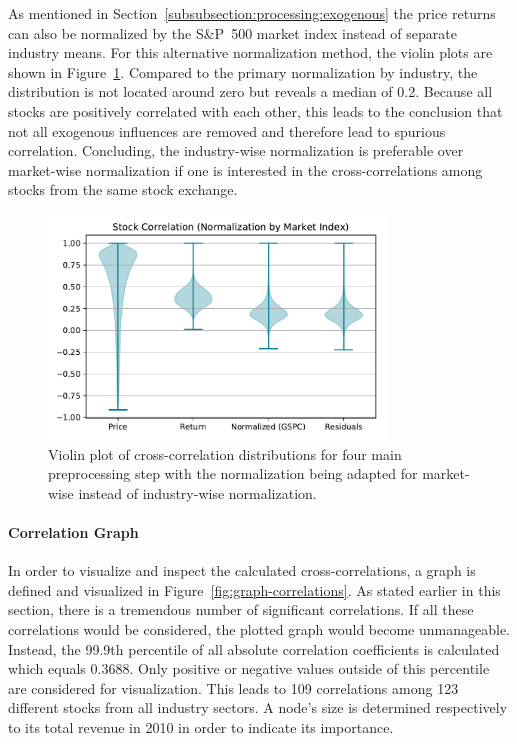 As mentioned in Section~\ref{subsubsection:processing:exogenous} the price returns can also be normalized by the S\&P~500 market index instead of separate industry means. For this alternative normalization method, the violin plots are shown in Figure~\ref{fig:steps-correlations-gspc}. Compared to the primary normalization by industry, the distribution is not located around zero but reveals a median of 0.2. Because all stocks are positively correlated with each other, this leads to the conclusion that not all exogenous influences are removed and therefore lead to spurious correlation. Concluding, the industry-wise normalization is preferable over market-wise normalization if one is interested in the cross-correlations among stocks from the same stock exchange.

\begin{figure}[!ht]
    \centering
    \includegraphics[width=0.8\textwidth]{figures/regression/steps-correlations-gspc-norm.pdf}
    \caption{Violin plot of cross-correlation distributions for four main preprocessing step with the normalization being adapted for market-wise instead of industry-wise normalization.}
    \label{fig:steps-correlations-gspc}
\end{figure}


\paragraph{Correlation Graph}

In order to visualize and inspect the calculated cross-correlations, a graph is defined and visualized in Figure~\ref{fig:graph-correlations}. As stated earlier in this section, there is a tremendous number of significant correlations. If all these correlations would be considered, the plotted graph would become unmanageable. Instead, the 99.9th percentile of all absolute correlation coefficients is calculated which equals 0.3688. Only positive or negative values outside of this percentile are considered for visualization. This leads to 109 correlations among 123 different stocks from all industry sectors. A node's size is determined respectively to its total revenue in 2010 in order to indicate its importance.

